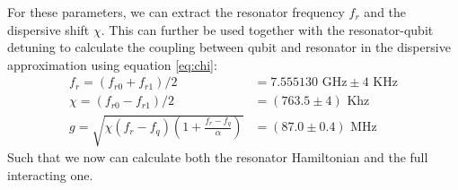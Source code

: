 For these parameters, we can extract the resonator frequency $f_r$ and the dispersive shift $\chi$. This can further be used together with the resonator-qubit detuning to calculate the coupling between qubit and resonator in the dispersive approximation using equation \ref{eq:chi}:
\begin{align}
    f_r  = (f_{r0} + f_{r1}) / 2 &= 7.555130 \text{ GHz} \pm 4 \text{ KHz} \\
    \chi = (f_{r0} - f_{r1}) / 2 &= (763.5 \pm 4) \text{ Khz}  \label{eq:dispersive_shift}\\
    g    = \sqrt{\chi (f_r - f_q)\left(1 + \frac{f_r - f_q}{\alpha}\right)} &= (87.0 \pm 0.4) \text{ MHz}
\end{align}
Such that we now can calculate both the resonator Hamiltonian and the full interacting one.

